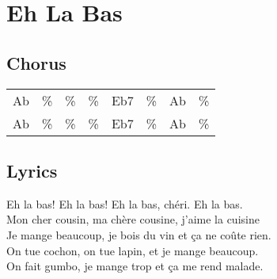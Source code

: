 \section{Eh La Bas}


\subsection*{Chorus}


\begin{tabular}{l l l l l l l l}
Ab & \% & \% & \% & Eb7 & \% & Ab & \% \\ 
Ab & \% & \% & \% & Eb7 & \% & Ab & \% \\ 
\end{tabular}


\subsection*{Lyrics}


Eh la bas! Eh la bas! Eh la bas, chéri. Eh la bas. \\ 

Mon cher cousin, ma chère cousine, j'aime la cuisine \\ 

Je mange beaucoup, je bois du vin et ça ne coûte rien. \\ 

On tue cochon, on tue lapin, et je mange beaucoup. \\ 

On fait gumbo, je mange trop et ça me rend malade. \\ 

